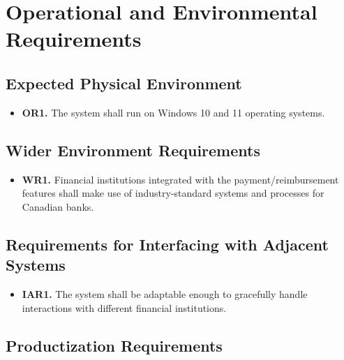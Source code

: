 \documentclass[12pt]{article}
\begin{document}
\section{Operational and Environmental Requirements}

\label{OpsandEnv}

\subsection{Expected Physical Environment}

\label{OR1}

\begin{itemize}
    \item \textbf{OR1.} The system shall run on Windows 10 and 11 operating systems.
\end{itemize}

\subsection{Wider Environment Requirements}

\label{WR}

\begin{itemize}
    \item \textbf{WR1.} Financial institutions integrated with the payment/reimbursement features shall make use of industry-standard systems and processes for Canadian banks.
\end{itemize}

\subsection{Requirements for Interfacing with Adjacent Systems}

\label{IAR}

\begin{itemize}
    \item \textbf{IAR1.} The system shall be adaptable enough to gracefully handle interactions with different financial institutions.
\end{itemize}

\subsection{Productization Requirements}

\label{PRD}
\end{document}
